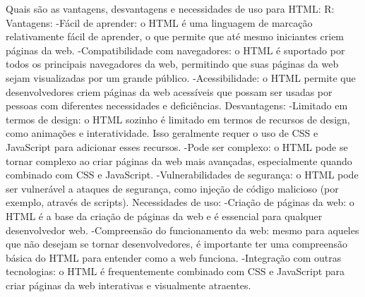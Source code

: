 Quais são as vantagens, desvantagens e necessidades de uso para HTML:
R:
Vantagens:
  -Fácil de aprender: o HTML é uma linguagem de marcação relativamente fácil de aprender, o que permite que até mesmo iniciantes criem páginas da web.
  -Compatibilidade com navegadores: o HTML é suportado por todos os principais navegadores da web, permitindo que suas páginas da web sejam visualizadas por um grande público.
  -Acessibilidade: o HTML permite que desenvolvedores criem páginas da web acessíveis que possam ser usadas por pessoas com diferentes necessidades e deficiências.
Desvantagens:
  -Limitado em termos de design: o HTML sozinho é limitado em termos de recursos de design, como animações e interatividade. Isso geralmente requer o uso de CSS e JavaScript para adicionar esses recursos.
  -Pode ser complexo: o HTML pode se tornar complexo ao criar páginas da web mais avançadas, especialmente quando combinado com CSS e JavaScript.
  -Vulnerabilidades de segurança: o HTML pode ser vulnerável a ataques de segurança, como injeção de código malicioso (por exemplo, através de scripts).
Necessidades de uso:
  -Criação de páginas da web: o HTML é a base da criação de páginas da web e é essencial para qualquer desenvolvedor web.
  -Compreensão do funcionamento da web: mesmo para aqueles que não desejam se tornar desenvolvedores, é importante ter uma compreensão básica do HTML para entender como a web funciona.
  -Integração com outras tecnologias: o HTML é frequentemente combinado com CSS e JavaScript para criar páginas da web interativas e visualmente atraentes.